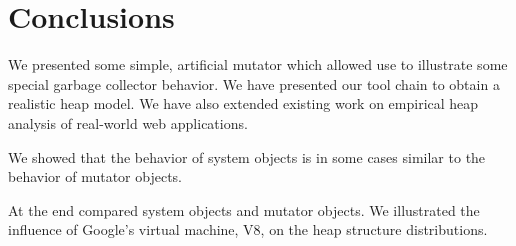 
\section{Conclusions}

We presented some simple, artificial mutator which allowed use to illustrate some special garbage collector behavior. We have presented our tool chain to obtain a realistic \JS heap model. We have also extended existing work on empirical \JS heap analysis of real-world web applications. %

We showed that the behavior of system objects is in some cases similar to the behavior of mutator objects. 


At the end compared system objects and mutator objects. We illustrated the influence of Google's \JS virtual machine, V8, on the heap structure distributions.